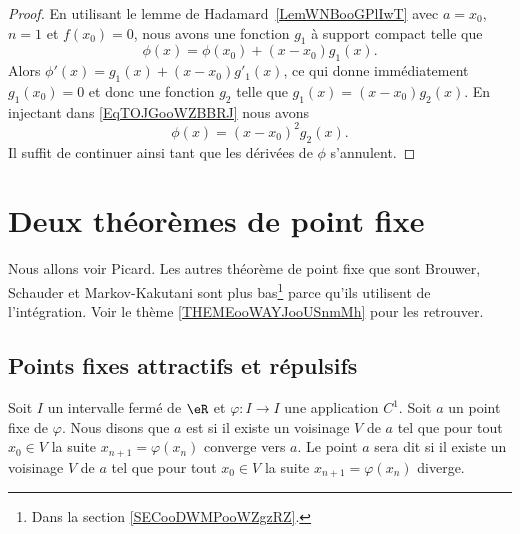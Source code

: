 \begin{proof}
    En utilisant le lemme de Hadamard~\ref{LemWNBooGPlIwT} avec \( a=x_0\), \( n=1\) et \( f(x_0)=0\), nous avons une fonction \( g_1\) à support compact telle que
    \begin{equation}        \label{EqTOJGooWZBBRJ}
        \phi(x)=\phi(x_0)+(x-x_0)g_1(x).
    \end{equation}
    Alors \( \phi'(x)=g_1(x)+(x-x_0)g'_1(x)\), ce qui donne immédiatement \( g_1(x_0)=0\) et donc une fonction \( g_2\) telle que \( g_1(x)=(x-x_0)g_2(x)\). En injectant dans \eqref{EqTOJGooWZBBRJ} nous avons
    \begin{equation}
        \phi(x)=(x-x_0)^2g_2(x).
    \end{equation}
    Il suffit de continuer ainsi tant que les dérivées de \( \phi\) s'annulent.
\end{proof}

\section{Deux théorèmes de point fixe}

Nous allons voir Picard. Les autres théorème de point fixe que sont Brouwer, Schauder et Markov-Kakutani sont plus bas\footnote{Dans la section \ref{SECooDWMPooWZgzRZ}.} parce qu'ils utilisent de l'intégration. Voir le thème \ref{THEMEooWAYJooUSnmMh} pour les retrouver.

\subsection{Points fixes attractifs et répulsifs}

\begin{definition}      \label{DEFooTMZUooMoBDGC}
    Soit \( I\) un intervalle fermé de \( \eR\) et \( \varphi\colon I\to I\) une application \( C^1\). Soit \( a\) un point fixe de \( \varphi\). Nous disons que \( a\) est  si il existe un voisinage \( V\) de \( a\) tel que pour tout \( x_0\in V\) la suite \( x_{n+1}=\varphi(x_n)\) converge vers \( a\). Le point \( a\) sera dit  si il existe un voisinage \( V\) de \( a\) tel que pour tout \( x_0\in V\) la suite \( x_{n+1}=\varphi(x_n)\) diverge.
\end{definition}

